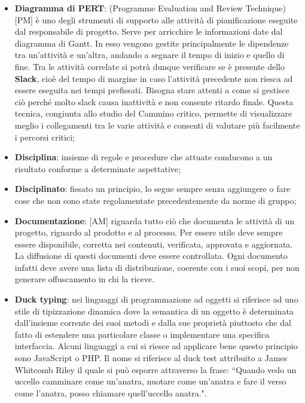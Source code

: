 \begin{itemize}
	\item \textbf {Diagramma di PERT}: (Programme Evaluation and Review Technique) [PM] è uno degli strumenti di supporto alle attività di pianificazione eseguite dal responsabile di progetto. \newline
Serve per arricchire le informazioni date dal diagramma di Gantt. In esso vengono gestite principalmente le dipendenze tra un'attività e un'altra, andando a segnare il tempo di inizio e quello di fine. Tra le attività correlate si potrà dunque verificare se è presente dello \textbf{Slack}, cioè del tempo di margine in caso l'attività precedente non riesca ad essere eseguita nei tempi prefissati. Bisogna stare attenti a come si gestisce ciò perché molto slack causa inattività e non consente ritardo finale.   \newline
Questa tecnica, congiunta allo studio del Cammino critico, permette di visualizzare meglio i collegamenti tra le varie attività e consenti di valutare più facilmente i percorsi critici;

	\item \textbf{Disciplina}: insieme di regole e procedure che attuate conducono a un risultato conforme a determinate aspettative;
	\item \textbf{Disciplinato}: fissato un principio, lo segue sempre senza aggiungere o fare cose che non sono state regolamentate precedentemente da norme di gruppo;
	\item \textbf{Documentazione}: [AM] riguarda tutto ciò che documenta le attività di un progetto, riguardo al prodotto e al processo.
	Per essere utile deve sempre essere disponibile, corretta nei contenuti, verificata, approvata e aggiornata. La diffusione di questi documenti deve essere controllata. Ogni documento infatti deve avere una lista di distribuzione, coerente con i suoi scopi, per non generare offuscamento in chi la riceve.
	\item \textbf{Duck typing}: nei linguaggi di programmazione ad oggetti si riferisce ad uno stile di tipizzazione dinamica dove la semantica di un oggetto è determinata dall'insieme corrente dei suoi metodi e dalla sue proprietà piuttosto che dal fatto di estendere una particolare classe o implementare una specifica interfaccia. \newline
Alcuni linguaggi a cui si riesce ad applicare bene questo principio sono JavaScript o PHP.
Il nome si riferisce al duck test attribuito a James Whitcomb Riley il quale si può esporre attraverso la frase: ``Quando vedo un uccello camminare come un'anatra, nuotare come un'anatra e fare il verso come l'anatra, posso chiamare quell'uccello anatra.".

\end{itemize}
